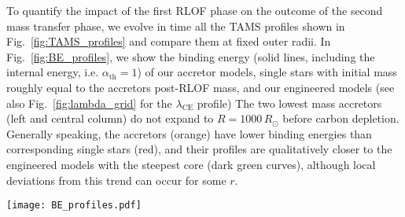 \documentclass[twocolumn,twocolappendix,trackchanges]{aastex63}
\DeclareRobustCommand{\Eqref}[1]{Eq.~\ref{#1}}
\DeclareRobustCommand{\Figref}[1]{Fig.~\ref{#1}}
\newcommand{\todo}[1]{{\large $\blacksquare$~\textbf{\color{red}[#1]}}~$\blacksquare$}
\begin{document}
To quantify the impact of the first RLOF phase on the outcome of the
second mass transfer phase, we evolve in time all the TAMS profiles
shown in \Figref{fig:TAMS_profiles} and compare them at fixed outer
radii. %
In \Figref{fig:BE_profiles}, we show the binding energy (solid lines,
including the internal energy, i.e. $\alpha_\mathrm{th}=1$) %
of our accretor models, single stars with initial mass roughly equal
to the accretors post-RLOF mass, and our engineered models (see also
\Figref{fig:lambda_grid} for the $\lambda_\mathrm{CE}$ profile) The two
lowest mass accretors (left and central column) do not expand to
$R=1000\, R_\odot$ before carbon depletion. Generally speaking, the
accretors (orange) have lower binding energies than corresponding
single stars (red), and their profiles are qualitatively closer to the
engineered models with the steepest core (dark green curves), although
local deviations from this trend can occur for some $r$.

\begin{figure*}[hbtp]
  \texttt{[image: BE\_profiles.pdf]}
  \caption{Binding energy profile at fixed radii (right y-axis) as a
    function of radial mass coordinate. We only show profiles with
    $\alpha_\mathrm{th}=1$, that is accounting for the internal energy
    content of the star. Orange, red, and other colors show
    respectively the accretor models, single stars of same post-RLOF
    total mass, and engineered models with varying CEB steepness.
    Titles indicates the pre-RLOF and approximate post-RLOF accretor
    masses, and vertical gray dashed lines mark the total radius $R$
    of these models.}
  \label{fig:BE_profiles}
\end{figure*}
\end{document}
